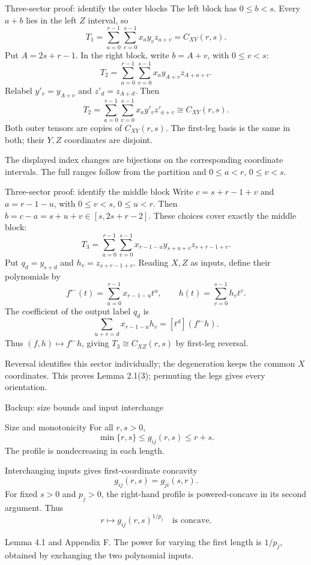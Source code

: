 \documentclass[aspectratio=169,11pt]{beamer}
\newcommand{\source}[1]{\vfill\par{\fontsize{7.5}{9}\selectfont\color{muted}#1\par}}
\begin{document}
\begin{frame}{Three-sector proof: identify the outer blocks}
  The left block has $0\le b<s$. Every $a+b$ lies in the left $Z$ interval, so
  \[
    T_1=\sum_{a=0}^{r-1}\sum_{v=0}^{s-1}x_a y_v z_{a+v}
      =C_{XY}(r,s).
  \]
  Put $A=2s+r-1$. In the right block, write $b=A+v$, with $0\le v<s$:
  \[
    T_2=\sum_{a=0}^{r-1}\sum_{v=0}^{s-1}
      x_a y_{A+v}z_{A+a+v}.
  \]
  Relabel $y'_v=y_{A+v}$ and $z'_d=z_{A+d}$. Then
  \[
    T_2=\sum_{a=0}^{r-1}\sum_{v=0}^{s-1}x_a y'_v z'_{a+v}
      \cong C_{XY}(r,s).
  \]
  Both outer tensors are copies of $C_{XY}(r,s)$.
  The first-leg basis is the same in both; their $Y,Z$ coordinates are disjoint.
  \source{The displayed index changes are bijections on the corresponding
  coordinate intervals. The full ranges follow from the partition and
  $0\le a<r$, $0\le v<s$.}
\end{frame}

\begin{frame}{Three-sector proof: identify the middle block}
  Write $c=s+r-1+v$ and $a=r-1-u$, with $0\le v<s$, $0\le u<r$.
  Then $b=c-a=s+u+v\in[s,2s+r-2]$.
  These choices cover exactly the middle block:
  \[
    T_3=\sum_{u=0}^{r-1}\sum_{v=0}^{s-1}
      x_{r-1-u}y_{s+u+v}z_{s+r-1+v}.
  \]
  Put $q_d=y_{s+d}$ and $h_v=z_{s+r-1+v}$. Reading $X,Z$ as inputs,
  define their polynomials by
  \[
    f^\leftarrow(t)=\sum_{u=0}^{r-1}x_{r-1-u}t^u,
    \qquad h(t)=\sum_{v=0}^{s-1}h_v t^v.
  \]
  The coefficient of the output label $q_d$ is
  \[
    \sum_{u+v=d}x_{r-1-u}h_v=[t^d](f^\leftarrow h).
  \]
  Thus $(f,h)\mapsto f^\leftarrow h$, giving $T_3\cong C_{XZ}(r,s)$
  by first-leg reversal.
  \source{Reversal identifies this sector individually; the degeneration keeps
  the common $X$ coordinates. This proves Lemma 2.1(3);
  permuting the legs gives every orientation.}
\end{frame}

\begin{frame}{Backup: size bounds and input interchange}
  \begin{block}{Size and monotonicity}
    For all $r,s>0$,
    \[
      \min\{r,s\}\le g_{ij}(r,s)\le r+s.
    \]
    The profile is nondecreasing in each length.
  \end{block}
  \begin{block}{Interchanging inputs gives first-coordinate concavity}
    \[
      g_{ij}(r,s)=g_{ji}(s,r).
    \]
    For fixed $s>0$ and $p_j>0$, the right-hand profile is powered-concave
    in its second argument. Thus
    \[
      r\longmapsto g_{ij}(r,s)^{1/p_j}\quad\text{is concave}.
    \]
  \end{block}
  \source{Lemma 4.1 and Appendix F. The power for varying the first length
  is $1/p_j$, obtained by exchanging the two polynomial inputs.}
\end{frame}
\end{document}
